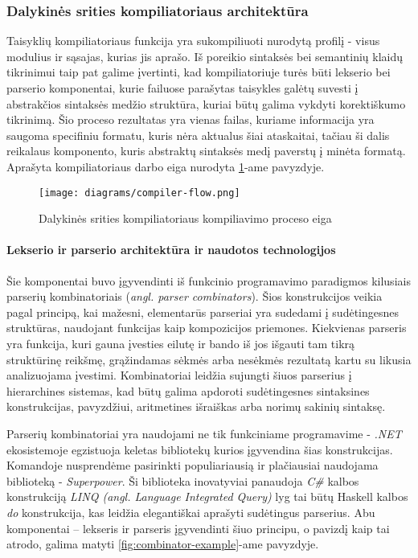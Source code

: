 \begin{activities}
{        \subsubsection{Dalykinės srities kompiliatoriaus architektūra}

        Taisyklių kompiliatoriaus funkcija yra sukompiliuoti nurodytą profilį - visus modulius ir sąsajas, kurias jis aprašo. Iš poreikio sintaksės bei semantinių klaidų tikrinimui taip pat galime įvertinti, kad kompiliatoriuje turės būti lekserio bei parserio komponentai, kurie failuose parašytas taisykles galėtų suvesti į abstrakčios sintaksės medžio struktūra, kuriai būtų galima vykdyti korektiškumo tikrinimą. Šio proceso rezultatas yra vienas failas, kuriame informacija yra saugoma specifiniu formatu, kuris nėra aktualus šiai ataskaitai, tačiau ši dalis reikalaus komponento, kuris abstraktų sintaksės medį paverstų į minėta formatą. Aprašyta kompiliatoriaus darbo eiga nurodyta \ref{fig:compiler-flow}-ame pavyzdyje.

        \begin{figure}
            \centering
            \texttt{[image: diagrams/compiler-flow.png]}
            \caption{Dalykinės srities kompiliatoriaus kompiliavimo proceso eiga}
            \label{fig:compiler-flow}
        \end{figure}

        \paragraph{Lekserio ir parserio architektūra ir naudotos technologijos}

        Šie komponentai buvo įgyvendinti iš funkcinio programavimo paradigmos kilusiais parserių kombinatoriais (\textit{angl. parser combinators}). Šios konstrukcijos veikia pagal principą, kai mažesni, elementarūs parseriai yra sudedami į sudėtingesnes struktūras, naudojant funkcijas kaip kompozicijos priemones. Kiekvienas parseris yra funkcija, kuri gauna įvesties eilutę ir bando iš jos išgauti tam tikrą struktūrinę reikšmę, grąžindamas sėkmės arba nesėkmės rezultatą kartu su likusia analizuojama įvestimi. Kombinatoriai leidžia sujungti šiuos parserius į hierarchines sistemas, kad būtų galima apdoroti sudėtingesnes sintaksines konstrukcijas, pavyzdžiui, aritmetines išraiškas arba norimų sakinių sintaksę. 
        
        Parserių kombinatoriai yra naudojami ne tik funkciniame programavime - \textit{.NET} ekosistemoje egzistuoja keletas bibliotekų kurios įgyvendina šias konstrukcijas. Komandoje nusprendėme pasirinkti populiariausią ir plačiausiai naudojama biblioteką - \textit{Superpower}. Ši biblioteka inovatyviai panaudoja \textit{C\#} kalbos konstrukciją \textit{LINQ (angl. Language Integrated Query)} lyg tai būtų Haskell kalbos \textit{do} konstrukcija, kas leidžia elegantiškai aprašyti sudėtingus parserius. Abu komponentai -- lekseris ir parseris įgyvendinti šiuo principu, o pavizdį kaip tai atrodo, galima matyti \ref{fig:combinator-example}-ame pavyzdyje.

}
\end{activities}
